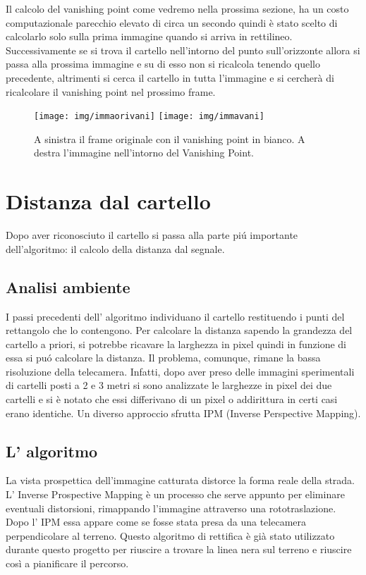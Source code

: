		Il calcolo del vanishing point come vedremo nella prossima sezione, ha un costo computazionale parecchio elevato di circa un secondo quindi è stato scelto di calcolarlo solo sulla prima immagine quando si arriva in rettilineo. Successivamente se si trova il cartello nell'intorno del punto sull'orizzonte allora si passa alla prossima immagine e su di esso non si ricalcola tenendo quello precedente, altrimenti si cerca il cartello in tutta l'immagine e si cercherà di ricalcolare il vanishing point nel prossimo frame.

		\begin{figure}[!ht]
			\centering
			\texttt{[image: img/immaorivani]}
			\texttt{[image: img/immavani]}
			\caption[Esempio vanishin Point calcolato]{A sinistra il frame originale con il vanishing point in bianco. A destra l'immagine nell'intorno del Vanishing Point.}
		\end{figure}

\section{Distanza dal cartello}
	
	Dopo aver riconosciuto il cartello si passa alla parte pi\'u importante dell'algoritmo: il calcolo della distanza dal segnale.

	\subsection{Analisi ambiente}

		I passi precedenti dell' algoritmo individuano il cartello restituendo i punti del rettangolo che lo contengono. Per calcolare la distanza sapendo la grandezza del cartello a priori, si potrebbe ricavare la larghezza in pixel quindi in funzione di essa si pu\'o calcolare la distanza. Il problema, comunque, rimane la bassa risoluzione della telecamera. Infatti, dopo aver preso delle immagini sperimentali di cartelli posti a 2 e 3 metri si sono analizzate le larghezze in pixel dei due cartelli e si è notato che essi differivano di un pixel o addirittura in certi casi erano identiche. Un diverso approccio sfrutta IPM (Inverse Perspective Mapping).
		
	\subsection{L' algoritmo}

		La vista prospettica dell'immagine catturata distorce la forma reale della strada. L' Inverse Prospective Mapping è un processo che serve appunto per eliminare eventuali distorsioni, rimappando l'immagine attraverso una rototraslazione. Dopo l' IPM essa appare come se fosse stata presa da una telecamera perpendicolare al terreno. Questo algoritmo di rettifica è già stato utilizzato durante questo progetto\cite{Rettifica} per riuscire a trovare la linea nera sul terreno e riuscire così a pianificare il percorso.

